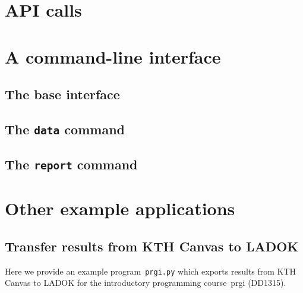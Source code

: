 \documentclass[a4paper]{report}
\begin{document}
\part{API calls}






\part{A command-line interface}

\chapter{The base interface}



\chapter{The \texttt{data} command}



\chapter{The \texttt{report} command}





\part{Other example applications}

\chapter{Transfer results from KTH Canvas to LADOK}

Here we provide an example program~\texttt{prgi.py} which exports results from KTH 
Canvas to LADOK for the introductory programming course~prgi (DD1315).




\printbibliography
\end{document}

